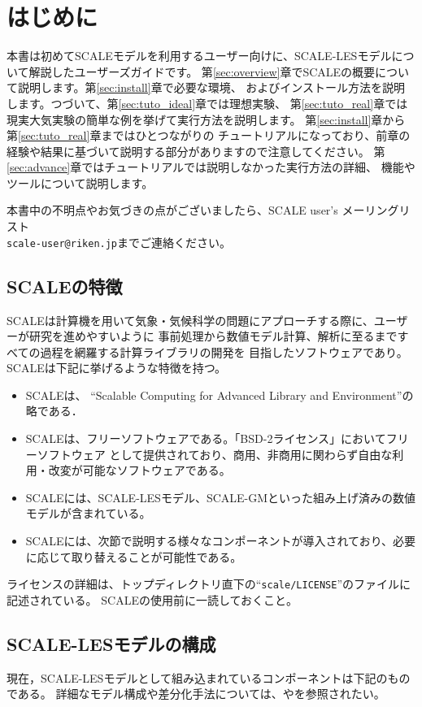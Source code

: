 \section{はじめに}

本書は初めてSCALEモデルを利用するユーザー向けに、SCALE-LESモデルについて解説したユーザーズガイドです。
第\ref{sec:overview}章でSCALEの概要について説明します。第\ref{sec:install}章で必要な環境、
およびインストール方法を説明します。つづいて、第\ref{sec:tuto_ideal}章では理想実験、
第\ref{sec:tuto_real}章では現実大気実験の簡単な例を挙げて実行方法を説明します。
第\ref{sec:install}章から第\ref{sec:tuto_real}章まではひとつながりの
チュートリアルになっており、前章の経験や結果に基づいて説明する部分がありますので注意してください。
第\ref{sec:advance}章ではチュートリアルでは説明しなかった実行方法の詳細、
機能やツールについて説明します。

本書中の不明点やお気づきの点がございましたら、SCALE user's メーリングリスト\\
 \verb|scale-user@riken.jp|までご連絡ください。



\subsection{SCALEの特徴}
SCALEは計算機を用いて気象・気候科学の問題にアプローチする際に、ユーザーが研究を進めやすいように
事前処理から数値モデル計算、解析に至るまですべての過程を網羅する計算ライブラリの開発を
目指したソフトウェアであり。SCALEは下記に挙げるような特徴を持つ。
\begin{itemize}
\item SCALEは、 ``Scalable Computing for Advanced Library and Environment''の略である．
\item SCALEは、フリーソフトウェアである。「BSD-2ライセンス」においてフリーソフトウェア
として提供されており、商用、非商用に関わらず自由な利用・改変が可能なソフトウェアである。
\item SCALEには、SCALE-LESモデル、SCALE-GMといった組み上げ済みの数値モデルが含まれている。
\item SCALEには、次節で説明する様々なコンポーネントが導入されており、必要に応じて取り替えることが可能性である。
\end{itemize}

ライセンスの詳細は、トップディレクトリ直下の``\verb|scale/LICENSE|''のファイルに記述されている。
SCALEの使用前に一読しておくこと。

\subsection{SCALE-LESモデルの構成}
現在，SCALE-LESモデルとして組み込まれているコンポーネントは下記のものである。
詳細なモデル構成や差分化手法については、\cite{scale_2015}や\cite{nishizawa_2015}を参照されたい。\\

